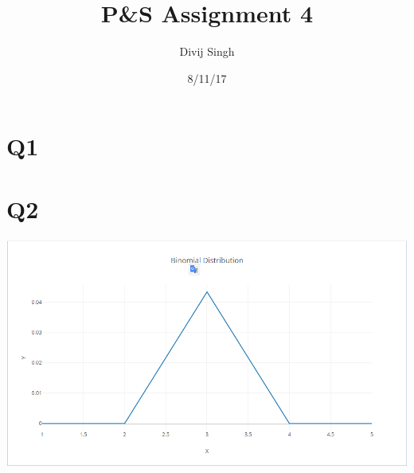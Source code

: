 \documentclass{article}
\title{P\&S Assignment 4}
\date{8/11/17}
\author{Divij Singh}
\begin{document}
	\maketitle
	
	\section{Q1}
	
		
		
	\section{Q2}
	\includegraphics{Capture.png}
	
	
		
		
\end{document}
